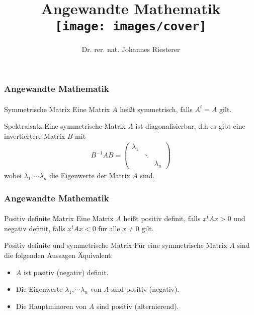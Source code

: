 \documentclass{beamer}
\begin{document}
\title[Angewandte Mathematik] %
{Angewandte Mathematik
\\
\texttt{[image: images/cover]}
}
\subtitle{}
\author[Dr. Johannes Riesterer] %
{Dr.  rer. nat. Johannes Riesterer}

\date[KPT 2004] %
{}

\subject{Angewandte Mathematik}

\frame{\titlepage}

\begin{frame}
    \frametitle{Angewandte Mathematik}
\framesubtitle{}
    \begin{block}{Symmetrische Matrix}
Eine Matrix $A$ heißt symmetrisch, falls $A^t = A$ gilt.
\end{block}

\begin{block}{Spektralsatz}
Eine symmetrische Matrix $A$ ist diagonalisierbar, d.h es gibt eine invertiertere Matrix $B$ mit 
\begin{align*}
B^{-1}A B = \begin{pmatrix}    \lambda_{1} & & \\
    & \ddots & \\
    & & \lambda_{n}\end{pmatrix}
\end{align*}
wobei $\lambda_1, \cdots \lambda_n$ die Eigenwerte der Matrix $A$ sind. 
\end{block}

 \end{frame}

\begin{frame}
    \frametitle{Angewandte Mathematik}
\framesubtitle{}
    \begin{block}{Positiv definite  Matrix}
Eine Matrix $A$ heißt positiv definit, falls $x^t Ax > 0$ und negativ definit, falls  $x^t Ax < 0$ für alle $x \neq 0$ gilt.
\end{block}

    \begin{block}{Positiv definite und symmetrische  Matrix}
Für eine symmetrische Matrix $A$ sind die folgenden Aussagen Äquivalent:
\begin{itemize}
\item $A$ ist positiv  (negativ) definit.
\item Die Eigenwerte $\lambda_1, \cdots \lambda_n$ von $A$ sind positiv (negativ).
\item Die Hauptminoren von $A$ sind positiv (alternierend).
\end{itemize}

\end{block}

 \end{frame}
\end{document}
